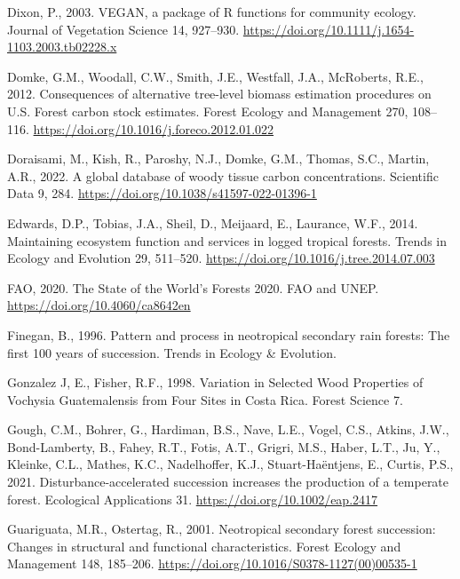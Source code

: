 \documentclass[
  12pt,
]{article}
\newlength{\cslhangindent}
\newlength{\cslentryspacingunit} %
\newenvironment{CSLReferences}[2] %
 {%
  \setlength{\parindent}{0pt}
  \ifodd #1
  \let\oldpar\par
  \def\par{\hangindent=\cslhangindent\oldpar}
  \fi
  \setlength{\parskip}{#2\cslentryspacingunit}
 }%
 {}
\begin{document}
\begin{CSLReferences}{1}{0}
\leavevmode{}%
Dixon, P., 2003. {VEGAN}, a package of {R} functions for community ecology. Journal of Vegetation Science 14, 927--930. \url{https://doi.org/10.1111/j.1654-1103.2003.tb02228.x}

\leavevmode{}%
Domke, G.M., Woodall, C.W., Smith, J.E., Westfall, J.A., McRoberts, R.E., 2012. Consequences of alternative tree-level biomass estimation procedures on {U}.{S}. Forest carbon stock estimates. Forest Ecology and Management 270, 108--116. \url{https://doi.org/10.1016/j.foreco.2012.01.022}

\leavevmode{}%
Doraisami, M., Kish, R., Paroshy, N.J., Domke, G.M., Thomas, S.C., Martin, A.R., 2022. A global database of woody tissue carbon concentrations. Scientific Data 9, 284. \url{https://doi.org/10.1038/s41597-022-01396-1}

\leavevmode{}%
Edwards, D.P., Tobias, J.A., Sheil, D., Meijaard, E., Laurance, W.F., 2014. Maintaining ecosystem function and services in logged tropical forests. Trends in Ecology and Evolution 29, 511--520. \url{https://doi.org/10.1016/j.tree.2014.07.003}

\leavevmode{}%
FAO, 2020. The {State} of the {World}'s {Forests} 2020. {FAO and UNEP}. \url{https://doi.org/10.4060/ca8642en}

\leavevmode{}%
Finegan, B., 1996. Pattern and process in neotropical secondary rain forests: The first 100 years of succession. Trends in Ecology \& Evolution.

\leavevmode{}%
Gonzalez J, E., Fisher, R.F., 1998. Variation in {Selected Wood Properties} of {Vochysia Guatemalensis} from {Four Sites} in {Costa Rica}. Forest Science 7.

\leavevmode{}%
Gough, C.M., Bohrer, G., Hardiman, B.S., Nave, L.E., Vogel, C.S., Atkins, J.W., Bond-Lamberty, B., Fahey, R.T., Fotis, A.T., Grigri, M.S., Haber, L.T., Ju, Y., Kleinke, C.L., Mathes, K.C., Nadelhoffer, K.J., Stuart-Haëntjens, E., Curtis, P.S., 2021. Disturbance-accelerated succession increases the production of a temperate forest. Ecological Applications 31. \url{https://doi.org/10.1002/eap.2417}

\leavevmode{}%
Guariguata, M.R., Ostertag, R., 2001. Neotropical secondary forest succession: {Changes} in structural and functional characteristics. Forest Ecology and Management 148, 185--206. \url{https://doi.org/10.1016/S0378-1127(00)00535-1}


\end{CSLReferences}
\end{document}
